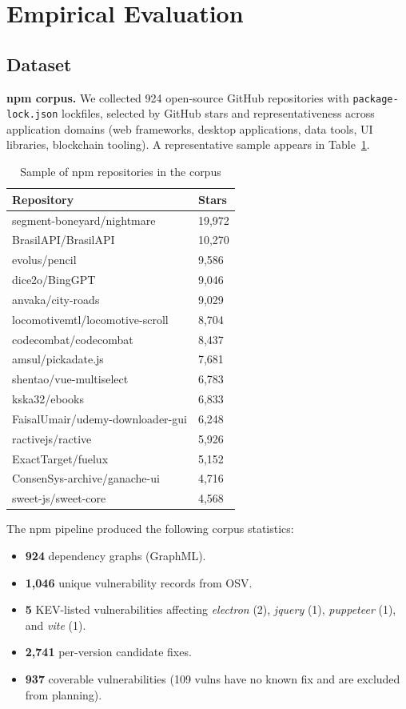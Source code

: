 \documentclass[conference]{IEEEtran}
\begin{document}
\section{Empirical Evaluation}
\label{sec:eval}

\subsection{Dataset}
\label{sec:dataset}

\textbf{npm corpus.}
We collected 924 open-source GitHub repositories with
\texttt{package-lock.json} lockfiles, selected by GitHub stars and
representativeness across application domains (web frameworks, desktop
applications, data tools, UI libraries, blockchain tooling).  A
representative sample appears in Table~\ref{tab:repos}.

\begin{table}[t]
\centering
\caption{Sample of npm repositories in the corpus}
\label{tab:repos}
\footnotesize
\begin{tabular}{ll}
\toprule
Repository & Stars \\
\midrule
segment-boneyard/nightmare & 19,972 \\
BrasilAPI/BrasilAPI & 10,270 \\
evolus/pencil & 9,586 \\
dice2o/BingGPT & 9,046 \\
anvaka/city-roads & 9,029 \\
locomotivemtl/locomotive-scroll & 8,704 \\
codecombat/codecombat & 8,437 \\
amsul/pickadate.js & 7,681 \\
shentao/vue-multiselect & 6,783 \\
kska32/ebooks & 6,833 \\
FaisalUmair/udemy-downloader-gui & 6,248 \\
ractivejs/ractive & 5,926 \\
ExactTarget/fuelux & 5,152 \\
ConsenSys-archive/ganache-ui & 4,716 \\
sweet-js/sweet-core & 4,568 \\
\bottomrule
\end{tabular}
\end{table}

The npm pipeline produced the following corpus statistics:
\begin{itemize}
  \item \textbf{924} dependency graphs (GraphML).
  \item \textbf{1,046} unique vulnerability records from OSV.
  \item \textbf{5} KEV-listed vulnerabilities affecting
        \textit{electron} (2), \textit{jquery} (1),
        \textit{puppeteer} (1), and \textit{vite} (1).
  \item \textbf{2,741} per-version candidate fixes.
  \item \textbf{937} coverable vulnerabilities (109 vulns have no
        known fix and are excluded from planning).
\end{itemize}
\end{document}
